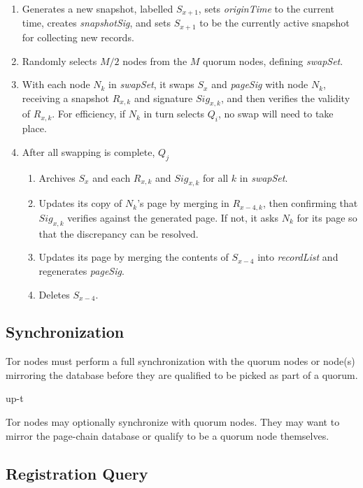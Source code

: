 \begin{enumerate}
	\item Generates a new snapshot, labelled $ S_{x+1} $, sets \textit{originTime} to the current time, creates \textit{snapshotSig}, and sets $ S_{x+1} $ to be the currently active snapshot for collecting new records.
	\item Randomly selects $ M / 2 $ nodes from the $ M $ quorum nodes, defining \textit{swapSet}.
	\item With each node $ N_{k} $ in \textit{swapSet}, it swaps $ S_{x} $ and \textit{pageSig} with node $ N_{k} $, receiving a snapshot $ R_{x, k} $ and signature $ Sig_{x, k} $, and then verifies the validity of $ R_{x, k} $. For efficiency, if $ N_{k} $ in turn selects $ Q_{i} $, no swap will need to take place.
	\item After all swapping is complete, $ Q_{j} $
		\begin{enumerate}
			\item Archives $ S_{x} $ and each $ R_{x, k} $ and $ Sig_{x, k} $ for all $ k $ in \textit{swapSet}.
			\item Updates its copy of $ N_{k} $'s page by merging in $ R_{x-4, k} $, then confirming that $ Sig_{x, k} $ verifies against the generated page. If not, it asks $ N_{k} $ for its page so that the discrepancy can be resolved.
			\item Updates its page by merging the contents of $ S_{x-4} $ into \textit{recordList} and regenerates \textit{pageSig}.
			\item Deletes $ S_{x-4} $.
		\end{enumerate}
\end{enumerate}




\subsection{Synchronization}

Tor nodes must perform a full synchronization with the quorum nodes or node(s) mirroring the database before they are qualified to be picked as part of a quorum. 

 up-t

Tor nodes may optionally synchronize with quorum nodes. They may want to mirror the page-chain database or qualify to be a quorum node themselves. 

\subsection{Registration Query}

